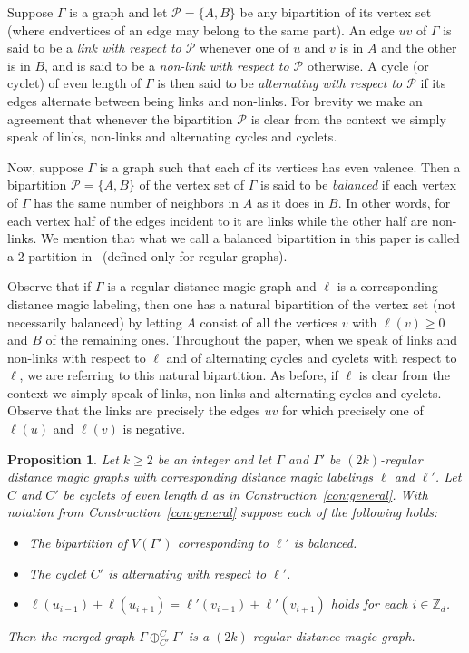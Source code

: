 \documentclass[11 pt,english]{article}
\newcommand{\ZZ}{\mathbb{Z}}
\newcommand{\G}{\Gamma}
\newcommand{\cP}{\mathcal{P}}
\newtheorem{proposition}[theorem]{Proposition}
\theoremstyle{definition}
\begin{document}
Suppose $\G$ is a graph and let $\cP = \{A,B\}$ be any bipartition of its vertex set (where endvertices of an edge may belong to the same part). An edge $uv$ of $\G$ is said to be a {\em link with respect to $\cP$} whenever one of $u$ and $v$ is in $A$ and the other is in $B$, and is said to be a {\em non-link with respect to $\cP$} otherwise. A cycle (or cyclet) of even length of $\G$ is then said to be {\em alternating with respect to $\cP$} if its edges alternate between being links and non-links. For brevity we make an agreement that whenever the bipartition $\cP$ is clear from the context we simply speak of links, non-links and alternating cycles and cyclets. 

Now, suppose $\G$ is a graph such that each of its vertices has even valence. Then a bipartition $\cP = \{A, B\}$ of the vertex set of $\G$ is said to be {\em balanced} if each vertex of $\G$ has the same number of neighbors in $A$ as it does in $B$. In other words, for each vertex half of the edges incident to it are links while the other half are non-links. We mention that what we call a balanced bipartition in this paper is called a $2$-partition in~\cite{CicNik17} (defined only for regular graphs). 

Observe that if $\G$ is a regular distance magic graph and $\ell$ is a corresponding distance magic labeling, then one has a natural bipartition of the vertex set (not necessarily balanced) by letting $A$ consist of all the vertices $v$ with $\ell(v) \geq 0$ and $B$ of the remaining ones. Throughout the paper, when we speak of links and non-links with respect to $\ell$ and of alternating cycles and cyclets with respect to $\ell$, we are referring to this natural bipartition. As before, if $\ell$ is clear from the context we simply speak of links, non-links and alternating cycles and cyclets. Observe that the links are precisely the edges $uv$ for which precisely one of $\ell(u)$ and $\ell(v)$ is negative. 

\begin{proposition}
\label{pro:con}
Let $k \geq 2$ be an integer and let $\G$ and $\G'$ be $(2k)$-regular distance magic graphs with corresponding distance magic labelings $\ell$ and $\ell'$. Let $C$ and $C'$ be cyclets of even length $d$ as in Construction~\ref{con:general}. With notation from Construction~\ref{con:general} suppose each of the following holds:
\begin{itemize}
\item[(i)] The bipartition of $V(\G')$ corresponding to $\ell'$ is balanced.
\item[(ii)] The cyclet $C'$ is alternating with respect to $\ell'$.
\item[(iii)] $\ell(u_{i-1}) + \ell(u_{i+1}) = \ell'(v_{i-1}) + \ell'(v_{i+1})$ holds for each $i \in \ZZ_{d}$.
\end{itemize}
Then the merged graph $\G\oplus^{C}_{C'} \G'$ is a $(2k)$-regular distance magic graph.
\end{proposition}
\end{document}
